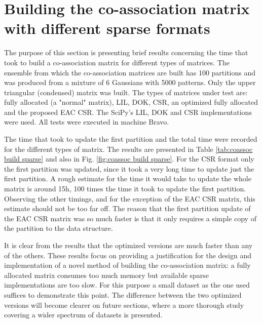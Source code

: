 \section{Building the co-association matrix with different sparse formats}
\label{sec:spare building}

The purpose of this section is presenting brief results concerning the time that took to build a co-association matrix for different types of matrices.
The ensemble from which the co-association matrices are built has 100 partitions and was produced from a mixture of 6 Gaussians with 5000 patterns.
Only the upper triangular (condensed) matrix was built.
The types of matrices under test are: fully allocated (a "normal" matrix), LIL, DOK, CSR, an optimized fully allocated and the proposed EAC CSR.
The SciPy's LIL, DOK and CSR implementations were used.
All tests were executed in machine Bravo.

The time that took to update the first partition and the total time were recorded for the different types of matrix.
The results are presented in Table \ref{tab:coassoc build sparse} and also in Fig. \ref{fig:coassoc build sparse}.
For the CSR format only the first partition was updated, since it took a very long time to update just the first partition.
A rough estimate for the time it would take to update the whole matrix is around 15h, 100 times the time it took to update the first partition.
Observing the other timings, and for the exception of the EAC CSR matrix, this estimate should not be too far off.
The reason that the first partition update of the EAC CSR matrix was so much faster is that it only requires a simple copy of the partition to the data structure.

It is clear from the results that the optimized versions are much faster than any of the others.
These results focus on providing a justification for the design and implementation of a novel method of building the co-association matrix: a fully allocated matrix consumes too much memory but available sparse implementations are too slow.
For this purpose a small dataset as the one used suffices to demonstrate this point.
The difference between the two optimized versions will become clearer on future sections, where a more thorough study covering a wider spectrum of datasets is presented. 


